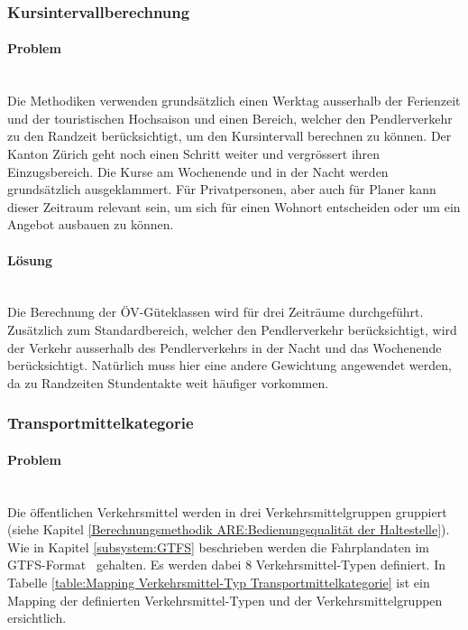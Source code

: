 \subsubsection{Kursintervallberechnung}
\label{Verbesserungsmöglichkeiten:Kursintervallberechnung}

\paragraph{Problem}~\\
Die Methodiken verwenden grundsätzlich einen Werktag ausserhalb der Ferienzeit und der touristischen Hochsaison und einen Bereich, welcher den Pendlerverkehr zu den Randzeit berücksichtigt, um den Kursintervall berechnen zu können.
Der Kanton Zürich geht noch einen Schritt weiter und vergrössert ihren Einzugsbereich.
Die Kurse am Wochenende und in der Nacht werden grundsätzlich ausgeklammert.
Für Privatpersonen, aber auch für Planer kann dieser Zeitraum relevant sein, um sich für einen Wohnort entscheiden oder um ein Angebot ausbauen zu können.

\paragraph{Lösung}~\\
Die Berechnung der \acs{ÖV}-Güteklassen wird für drei Zeiträume durchgeführt.
Zusätzlich zum Standardbereich, welcher den Pendlerverkehr berücksichtigt, wird der Verkehr ausserhalb des Pendlerverkehrs in der Nacht und das Wochenende berücksichtigt.
Natürlich muss hier eine andere Gewichtung angewendet werden, da zu Randzeiten Stundentakte weit häufiger vorkommen.

\subsubsection{Transportmittelkategorie}
\label{Verbesserungsmöglichkeiten:Transportmittelkategorie}

\paragraph{Problem}~\\
Die öffentlichen Verkehrsmittel werden in drei Verkehrsmittelgruppen gruppiert (siehe Kapitel \ref{Berechnungsmethodik ARE:Bedienungsqualität der Haltestelle}).
Wie in Kapitel \ref{subsystem:GTFS} beschrieben werden die Fahrplandaten im \acs{GTFS}-Format~\cite{gtfs_spec} gehalten. 
Es werden dabei 8 Verkehrsmittel-Typen definiert.
In Tabelle \ref{table:Mapping Verkehrsmittel-Typ Transportmittelkategorie} ist ein Mapping der definierten Verkehrsmittel-Typen und der Verkehrsmittelgruppen ersichtlich.

